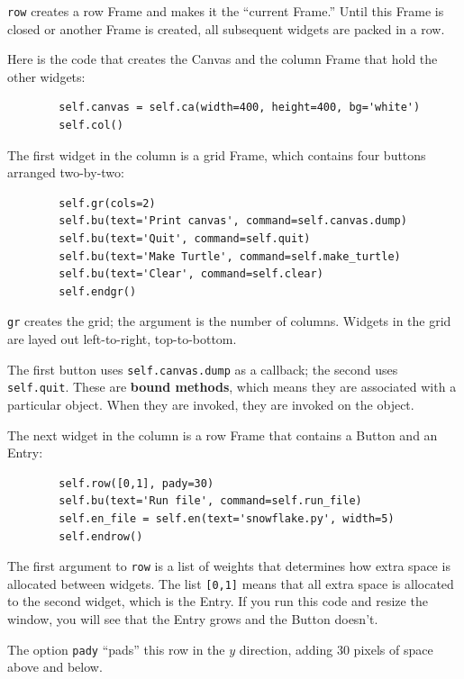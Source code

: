 \documentclass[10pt]{book}
\begin{document}
{\tt row} creates a row Frame and makes it the ``current Frame.''
Until this Frame is closed or another Frame is created, all
subsequent widgets are packed in a row.

Here is the code that creates the Canvas and the column Frame
that hold the other widgets:

\beforeverb
\begin{verbatim}
        self.canvas = self.ca(width=400, height=400, bg='white')
        self.col()
\end{verbatim}
\afterverb
%
The first widget in the column is a grid Frame, which contains
four buttons arranged two-by-two:

\beforeverb
\begin{verbatim}
        self.gr(cols=2)
        self.bu(text='Print canvas', command=self.canvas.dump)
        self.bu(text='Quit', command=self.quit)
        self.bu(text='Make Turtle', command=self.make_turtle)
        self.bu(text='Clear', command=self.clear)
        self.endgr()
\end{verbatim}
\afterverb
%
{\tt gr} creates the grid; the argument is the number of
columns.  Widgets in the grid are
layed out left-to-right, top-to-bottom.


The first button uses {\tt self.canvas.dump} as a callback; the second
uses {\tt self.quit}.  These are {\bf bound methods}, which means they
are associated with a particular object.  When they are invoked, they
are invoked on the object.

The next widget in the column is a row Frame that contains
a Button and an Entry:

\beforeverb
\begin{verbatim}
        self.row([0,1], pady=30)
        self.bu(text='Run file', command=self.run_file)
        self.en_file = self.en(text='snowflake.py', width=5)
        self.endrow()
\end{verbatim}
\afterverb
%
The first argument to {\tt row} is a list of weights that
determines how extra space is allocated between widgets.  
The list {\tt [0,1]} means that all extra space is allocated
to the second widget, which is the Entry.  If you run this code
and resize the window, you will see that the Entry grows and
the Button doesn't.

The option {\tt pady} ``pads'' this row in the $y$ direction,
adding 30 pixels of space above and below.
\end{document}
